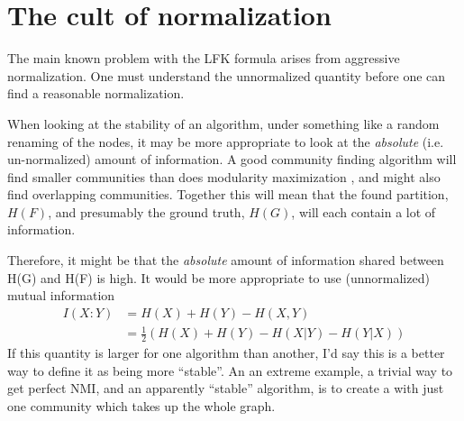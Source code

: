 \documentclass[9pt,technote]{IEEEtran}
\begin{document}

\section{The cult of normalization}
\label{sec:AbNormal}

The main known problem with the LFK formula arises from aggressive normalization.
One must understand the unnormalized quantity before one can find a reasonable normalization.

When looking at the stability of an algorithm, under something like a random renaming of the nodes, it may be more
appropriate to look at the \emph{absolute} (i.e. un-normalized) amount of information. A good community finding algorithm
will find smaller communities \cite{ResLimit} than does modularity maximization \cite{blondel-2008}, and might
also find overlapping communities. Together this will mean that the found partition, $H(F)$, and presumably the ground truth, $H(G)$, will
each contain a lot of information.

Therefore, it might be that the \emph{absolute} amount of information shared between H(G) and H(F) is high. It would be more
appropriate to use (unnormalized) mutual information
\begin{align*}
	I(X:Y) &=  H(X) + H(Y) - H(X,Y)          \\
				&= \frac12 \left( H(X) + H(Y) - H(X|Y) - H(Y|X) \right)
\end{align*}
If this quantity is larger for one algorithm than another, I'd say this is a better way to define it as being more ``stable''.
An an extreme example, a trivial way to get perfect NMI, and an apparently ``stable'' algorithm, is
to create a \grouping{} with just one community which takes up the whole graph.
\end{document}
